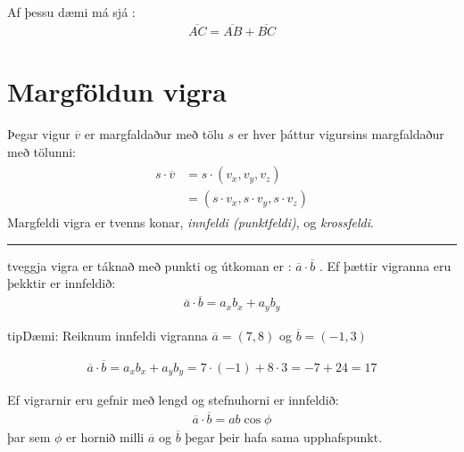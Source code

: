 \documentclass[a4paper,10pt,icelandic]{sphinxmanual}
\begin{document}
Af þessu dæmi má sjá  :
\begin{equation*}
\begin{split}\overline{AC} = \overline{AB} + \overline{BC}\end{split}
\end{equation*}

\section{Margföldun vigra}
\label{\detokenize{Kafli08:margfoldun-vigra}}
Þegar vigur \(\overline{v}\) er margfaldaður með tölu \(s\) er hver þáttur vigursins margfaldaður með tölunni:
\begin{equation*}
\begin{split}\begin{aligned}
    s\cdot\overline{v}  &= s\cdot(v_x, v_y, v_z)  \\
    &= (s \cdot v_x, s \cdot v_y, s \cdot v_z)
\end{aligned}\end{split}
\end{equation*}
Margfeldi vigra er tvenns konar, \textit{innfeldi (punktfeldi)}, og \textit{krossfeldi}.


\bigskip\hrule\bigskip


 tveggja vigra er táknað með punkti og útkoman er : \(\overline{a} \cdot \overline{b}\) .
Ef þættir vigranna eru þekktir er innfeldið:
\begin{equation*}
\begin{split}\overline{a} \cdot \overline{b} = a_x b_x + a_y b_y\end{split}
\end{equation*}
\begin{sphinxadmonition}{tip}{Dæmi:}
Reiknum innfeldi vigranna \(\overline{a}=(7,8)\) og \(\overline{b}=(-1,3)\)

\begin{equation*}
\begin{split}\overline{a} \cdot \overline{b} = a_x b_x + a_y b_y = 7\cdot (-1)+ 8\cdot 3 = -7+24 =17\end{split}
\end{equation*}\end{sphinxadmonition}

Ef vigrarnir eru gefnir með lengd og stefnuhorni er innfeldið:
\begin{equation*}
\begin{split}\overline{a} \cdot \overline{b} = a b \cos{\phi}\end{split}
\end{equation*}
þar sem \(\phi\) er hornið milli \(\overline{a}\) og \(\overline{b}\) þegar þeir hafa sama upphafspunkt.
\end{document}
